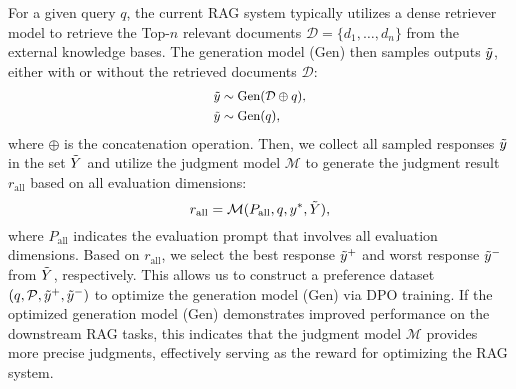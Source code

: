 For a given query $q$, the current RAG system typically utilizes a dense retriever model to retrieve the Top-$n$ relevant documents $\mathcal{D} = \{d_1, \dots, d_n\}$ from the external knowledge bases. The generation model ($\text{Gen}$) then samples outputs $\Tilde{y}$, either with or without the retrieved documents $\mathcal{D}$:
\begin{equation}\small
\begin{aligned}
    \Tilde{y} &\sim \text{Gen} (\mathcal{D} \oplus q), \\
    \Tilde{y} &\sim \text{Gen} (q),
\end{aligned}
\end{equation}
where $\oplus$ is the concatenation operation. Then, we collect all sampled responses $\Tilde{y}$ in the set $\Tilde{Y}$ and utilize the judgment model $\mathcal{M}$ to generate the judgment result $r_\text{all}$ based on all evaluation dimensions:
\begin{equation}\small
r_\text{all} = \mathcal{M}(P_\text{all}, q,y^*,\Tilde{Y}),
\end{equation}
where $P_\text{all}$ indicates the evaluation prompt that involves all evaluation dimensions. Based on $r_\text{all}$, we select the best response $\Tilde{y}^+$ and worst response $\Tilde{y}^-$ from $\Tilde{Y}$, respectively. This allows us to construct a preference dataset $(q, \mathcal{P}, \Tilde{y}^+, \Tilde{y}^-)$ to optimize the generation model ($\text{Gen}$) via DPO training. If the optimized generation model ($\text{Gen}$) demonstrates improved performance on the downstream RAG tasks, this indicates that the judgment model $\mathcal{M}$ provides more precise judgments, effectively serving as the reward for optimizing the RAG system.











